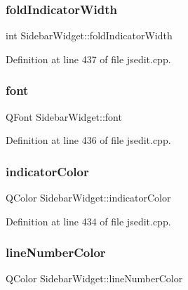 \subsubsection{\texorpdfstring{fold\+Indicator\+Width}{foldIndicatorWidth}}
{\footnotesize\ttfamily int Sidebar\+Widget\+::fold\+Indicator\+Width}



Definition at line 437 of file jsedit.\+cpp.

\mbox{\label{class_sidebar_widget_a8c38342a3799d3bfbe9671b3f5d28e1f}} 
\subsubsection{\texorpdfstring{font}{font}}
{\footnotesize\ttfamily Q\+Font Sidebar\+Widget\+::font}



Definition at line 436 of file jsedit.\+cpp.

\mbox{\label{class_sidebar_widget_a0221f90d581113d83c73af06e1738067}} 
\subsubsection{\texorpdfstring{indicator\+Color}{indicatorColor}}
{\footnotesize\ttfamily Q\+Color Sidebar\+Widget\+::indicator\+Color}



Definition at line 434 of file jsedit.\+cpp.

\mbox{\label{class_sidebar_widget_a0a577ea7fe9a4f2075fa19d1e601f987}} 
\subsubsection{\texorpdfstring{line\+Number\+Color}{lineNumberColor}}
{\footnotesize\ttfamily Q\+Color Sidebar\+Widget\+::line\+Number\+Color}



